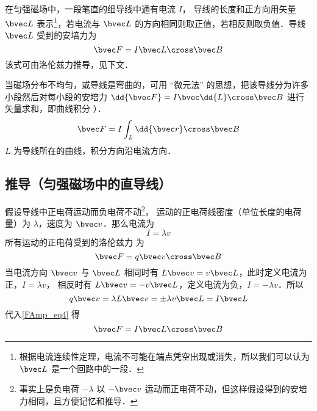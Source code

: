 

在匀强磁场中，一段笔直的细导线中通有电流 $I$， 导线的长度和正方向用矢量 $\bvec L$ 表示\footnote{根据电流连续性定理，电流不可能在端点凭空出现或消失，所以我们可以认为 $\bvec L$ 是一个回路中的一段．}，若电流与 $\bvec L$ 的方向相同则取正值，若相反则取负值．导线 $\bvec L$ 受到的安培力为
\begin{equation}\label{FAmp_eq1}
\bvec F = I \bvec L \cross \bvec B
\end{equation}
该式可由洛伦兹力推导，见下文．

当磁场分布不均匀，或导线是弯曲的，可用 “微元法” 的思想，把该导线分为许多小段然后对每小段的安培力 $\dd{\bvec F} = I\bvec \dd{L} \cross\bvec B$ 进行矢量求和，即曲线积分%
）．
\begin{equation}
\bvec F = I\int_L \dd{\bvec r} \cross \bvec B
\end{equation}
$L$ 为导线所在的曲线，积分方向沿电流方向．

\subsection{推导（匀强磁场中的直导线）}
假设导线中正电荷运动而负电荷不动\footnote{事实上是负电荷 $-\lambda$ 以 $-\bvec v$ 运动而正电荷不动，但这样假设得到的安培力相同，且方便记忆和推导．}， 运动的正电荷线密度（单位长度的电荷量）为 $\lambda$，速度为 $\bvec v$．那么电流为%
\begin{equation}
I = \lambda v
\end{equation}
所有运动的正电荷受到的洛伦兹力%
为
\begin{equation}\label{FAmp_eq4}
\bvec F =  q\bvec v \cross \bvec B
\end{equation}
当电流方向 $\bvec v$ 与 $\bvec L$ 相同时有 $L \bvec v = v \bvec L$，此时定义电流为正，$I = \lambda v$， 相反时有 $L \bvec v = -v\bvec L$，定义电流为负，$I = -\lambda v$．所以
\begin{equation}
q\bvec v = \lambda L \bvec v = \pm \lambda v\bvec L= I \bvec L
\end{equation}
代入\autoref{FAmp_eq4} 得
\begin{equation}
\bvec F = I \bvec L \cross \bvec B
\end{equation}


















